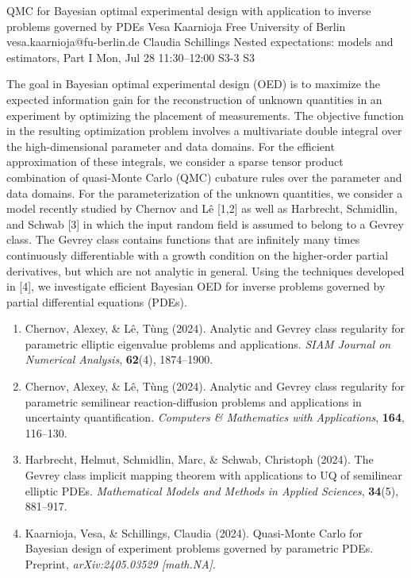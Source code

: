 \documentclass[12pt,lettersize,oneside]{book} %
\begin{document}
\begin{talk}
  {QMC for Bayesian optimal experimental design with application to inverse problems governed by PDEs}%
  {Vesa Kaarnioja}%
  {Free University of Berlin}%
  {vesa.kaarnioja@fu-berlin.de}%
  {Claudia Schillings}%
  {Nested expectations: models and estimators, Part I}%
  {Mon, Jul 28 11:30--12:00}%
  {S3-3}%
  {S3}%
    
   
The goal in Bayesian optimal experimental design (OED) is to maximize the expected information gain for the reconstruction of unknown quantities in an experiment by optimizing the placement of measurements. The objective function in the resulting optimization problem involves a multivariate double integral over the high-dimensional parameter and data domains. For the efficient approximation of these integrals, we consider a sparse tensor product combination of quasi-Monte Carlo (QMC) cubature rules over the parameter and data domains. For the parameterization of the unknown quantities, we consider a model recently studied by Chernov and L\^{e} [1,2] as well as Harbrecht, Schmidlin, and Schwab [3] in which the input random field is assumed to belong to a Gevrey class. The Gevrey class contains functions that are infinitely many times continuously differentiable with a growth condition on the higher-order partial derivatives, but which are not analytic in general. Using the techniques developed in [4], we investigate efficient Bayesian OED for inverse problems governed by partial differential equations (PDEs).
\begin{enumerate}
 \item[{[1]}] Chernov, Alexey, \& L\^{e}, T\`{u}ng (2024). Analytic and Gevrey class regularity for parametric elliptic eigenvalue problems and applications. \emph{SIAM Journal on Numerical Analysis}, \textbf{62}(4), 1874--1900.
 \item[{[2]}] Chernov, Alexey, \& L\^{e}, T\`{u}ng (2024). Analytic and Gevrey class regularity for parametric semilinear reaction-diffusion problems and applications in uncertainty quantification. \emph{Computers \& Mathematics with Applications}, \textbf{164}, 116--130.
 \item[{[3]}] Harbrecht, Helmut, Schmidlin, Marc, \& Schwab, Christoph (2024). The Gevrey class implicit mapping theorem with applications to UQ of semilinear elliptic PDEs. \emph{Mathematical Models and Methods in Applied Sciences}, \textbf{34}(5), 881--917.
 \item[{[4]}] Kaarnioja, Vesa, \& Schillings, Claudia (2024). Quasi-Monte Carlo for Bayesian design of experiment problems governed by parametric PDEs. Preprint, \emph{arXiv:2405.03529 [math.NA]}.
\end{enumerate}

\end{talk}
\end{document}
